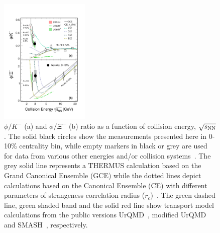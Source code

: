 \documentclass[%
 reprint,	
showpacs,
 amsmath,amssymb,
 aps,
 superscriptaddress,
]{revtex4-1}
\begin{document}
\begin{figure}
\centering
\hspace*{-4mm}
\includegraphics[width=0.38\textwidth]{fig/fig4_phi_over_kminus_zoomin.eps}
  \caption{ $\phi/K^-$ (a) and $\phi/\Xi^-$ (b) ratio as a function of collision energy, $\sqrt{s_{\rm NN}}$. The solid black circles show the measurements presented here in 0-10\% centrality bin, while empty markers in black or grey are used for data from various other energies and/or collision systems~\cite{E917_phi,NA49_phi,FOPI_phi_AlAl,FOPI_phi_NiNi,HADES_phi_ArKCl,HADES_phi_AuAu,Xi_ArKCl_HADES,star_bes_strangeness}. The grey solid line represents a THERMUS calculation based on the Grand Canonical Ensemble (GCE) while the dotted lines depict calculations based on the Canonical Ensemble (CE) with different parameters of strangeness correlation radius ($r_c$)~\cite{THERMUS_WHEATON200984,Andronic_2018Naure}. The green dashed line, green shaded band and the solid red line show transport model calculations from the public versions UrQMD~\cite{urQMD,UrQMD_2}, modified UrQMD~\cite{Steinheimer_2015_UrQMD} and SMASH~\cite{Elfner_SMASH}, respectively.}
\label{fig:phi2Kratio} 
\end{figure}
\end{document}
